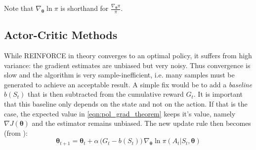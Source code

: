 Note that $\nabla_{\bm{\theta}} \ln \pi$ is shorthand for $\frac{\nabla_{\bm{\theta}} \pi}{ \pi}$.
\subsection{Actor-Critic Methods}
\label{sec:actor_critic}
While REINFORCE in theory converges to an optimal policy, it suffers from high variance: the gradient estimates are unbiased but very noisy. Thus convergence is slow and the algorithm is very sample-inefficient, i.e. many samples must be generated to achieve an acceptable result. A simple fix would be to add a \emph{baseline} $b(S_t)$ that is then subtracted from the cumulative reward $G_t$. It is important that this baseline only depends on the state and not on the action. If that is the case, the expected value in \ref{eqn:pol_grad_theorem} keeps it's value, namely $\nabla J(\bm{\theta})$ and the estimator remains unbiased. The new update rule then becomes (from \cite{sutton2018reinforcement}):
\begin{equation}
    \label{eqn:pg_update}
    \bm{\theta}_{t+1} = \bm{\theta}_{t} + \alpha \,\big ( G_t - b(S_t) \big) \, \nabla_{\bm{\theta}} \ln \pi(A_t|S_t,\bm{\theta})
\end{equation}

